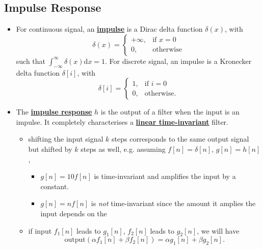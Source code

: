 \documentclass[twocolumn,landscape,10pt]{article}
\theoremstyle{definition}
\begin{document}
\subsection{Impulse Response}

\begin{itemize}
    \item For continuous signal, an \underline{\textbf{impulse}} 
        is a Dirac delta function $\delta(x)$, with
        \[
            \delta(x)=
            \begin{cases}
                +\infty, & \text{if $x=0$} \\
                0, & \text{otherwise}
            \end{cases} 
        \]
        such that $\int_{-\infty}^{\infty} \delta(x)\mathrm{d}x=1$.
        For discrete signal, an impulse is a Kronecker delta function $\delta[i]$, with
        \[
            \delta[i]=
            \begin{cases}
                1, & \text{if $i=0$} \\
                0, & \text{otherwise}.
            \end{cases} 
        \]
    \item The \underline{\textbf{impulse response}} $h$ is the output of a filter
        when the input is an impulse. It completely characterises a
        \underline{\textbf{linear time-invariant}} filter.
        \begin{itemize}
            \item shifting the input signal $k$ steps corresponds to the same
                output signal but shifted by $k$ steps as well, e.g. assuming
                $f[n]=\delta[n]$, $g[n]=h[n]$,
                \begin{itemize}
                    \item $g[n]=10f[n]$ is time-invariant and amplifies the
                        input by a constant.
                    \item $g[n]=nf[n]$ is \emph{not} time-invariant since the
                        amount it amplies the input depends on the 
                \end{itemize} 
            \item if input $f_1[n]$ leads to $g_1[n]$, $f_2[n]$ leads to
                $g_2[n]$, we will have
                \[
                    \text{output}(\alpha f_1[n]+\beta f_2[n])=\alpha
                    g_1[n]+\beta g_2[n].
                \]
        \end{itemize} 
\end{itemize} 
\end{document}
